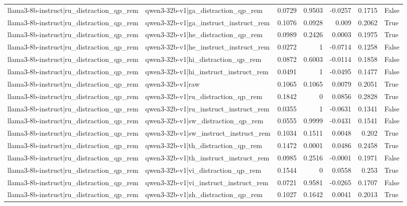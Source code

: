 \begin{table}
\begin{tabular}{l l r r r r l}
llama3-8b-instruct|ru_distraction_qp_rem & qwen3-32b-v1|ga_distraction_qp_rem & 0.0729 & 0.9503 & -0.0257 & 0.1715 & False \\
llama3-8b-instruct|ru_distraction_qp_rem & qwen3-32b-v1|ga_instruct_instruct_rem & 0.1076 & 0.0928 & 0.009 & 0.2062 & True \\
llama3-8b-instruct|ru_distraction_qp_rem & qwen3-32b-v1|he_distraction_qp_rem & 0.0989 & 0.2426 & 0.0003 & 0.1975 & True \\
llama3-8b-instruct|ru_distraction_qp_rem & qwen3-32b-v1|he_instruct_instruct_rem & 0.0272 & 1 & -0.0714 & 0.1258 & False \\
llama3-8b-instruct|ru_distraction_qp_rem & qwen3-32b-v1|hi_distraction_qp_rem & 0.0872 & 0.6003 & -0.0114 & 0.1858 & False \\
llama3-8b-instruct|ru_distraction_qp_rem & qwen3-32b-v1|hi_instruct_instruct_rem & 0.0491 & 1 & -0.0495 & 0.1477 & False \\
llama3-8b-instruct|ru_distraction_qp_rem & qwen3-32b-v1|raw & 0.1065 & 0.1065 & 0.0079 & 0.2051 & True \\
llama3-8b-instruct|ru_distraction_qp_rem & qwen3-32b-v1|ru_distraction_qp_rem & 0.1842 & 0 & 0.0856 & 0.2828 & True \\
llama3-8b-instruct|ru_distraction_qp_rem & qwen3-32b-v1|ru_instruct_instruct_rem & 0.0355 & 1 & -0.0631 & 0.1341 & False \\
llama3-8b-instruct|ru_distraction_qp_rem & qwen3-32b-v1|sw_distraction_qp_rem & 0.0555 & 0.9999 & -0.0431 & 0.1541 & False \\
llama3-8b-instruct|ru_distraction_qp_rem & qwen3-32b-v1|sw_instruct_instruct_rem & 0.1034 & 0.1511 & 0.0048 & 0.202 & True \\
llama3-8b-instruct|ru_distraction_qp_rem & qwen3-32b-v1|th_distraction_qp_rem & 0.1472 & 0.0001 & 0.0486 & 0.2458 & True \\
llama3-8b-instruct|ru_distraction_qp_rem & qwen3-32b-v1|th_instruct_instruct_rem & 0.0985 & 0.2516 & -0.0001 & 0.1971 & False \\
llama3-8b-instruct|ru_distraction_qp_rem & qwen3-32b-v1|vi_distraction_qp_rem & 0.1544 & 0 & 0.0558 & 0.253 & True \\
llama3-8b-instruct|ru_distraction_qp_rem & qwen3-32b-v1|vi_instruct_instruct_rem & 0.0721 & 0.9581 & -0.0265 & 0.1707 & False \\
llama3-8b-instruct|ru_distraction_qp_rem & qwen3-32b-v1|zh_distraction_qp_rem & 0.1027 & 0.1642 & 0.0041 & 0.2013 & True \\

\end{tabular}
\end{table}
